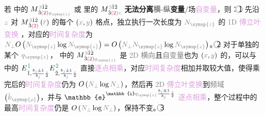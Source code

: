 {\two} 若  中的 ${M}^{\;\! \mathcolor{gray}{3} \hat{1} \hat{2} }_{\;\! \hat{3} \textcolor{Maroon}{(2)} \mathcolor{gray}{q_{\symup{z}}} }$ 或  里的 ${M}^{\;\! \mathcolor{gray}{3} \hat{1} \hat{2} }_{\;\! \hat{3} \textcolor{Maroon}{(2)} \mathcolor{gray}{z} }$ \textbf{无法分离\textcolor{gray}{横-纵}变量}/\textcolor{NavyBlue}{场}\textcolor{Plum}{自变量}，则：\textcircled{1} 先沿 $\textcolor{gray}{z}$ 对 ${M}^{\;\! \mathcolor{gray}{3} \hat{1} \hat{2} }_{\;\! \hat{3} \textcolor{Maroon}{(2)} } \left( \mathcolor{gray}{\bar{r}} \right)$ 的每个 $\left( \textcolor{gray}{x}, \textcolor{gray}{y} \right)$ 格点，独立执行一次长度为 $\textcolor{gray}{N_{\symup{z}}}$ 的 \textcolor{gray}{1D} \textcolor{Plum}{傅立叶变换} ，对应的\textcolor{Plum}{时间复杂度}为 $\textcolor{gray}{N_\perp} O \left( \textcolor{gray}{N_{\symup{z}}} \log \textcolor{gray}{N_{\symup{z}}} \right) = O \left( \textcolor{gray}{N_\perp} \textcolor{gray}{N_{\symup{z}}} \log \textcolor{gray}{N_{\symup{z}}} \right)$。\textcircled{2} 对于单独的某个 $\mathcolor{gray}{q_{\symup{z}}}$， 中的 ${M}^{\;\! \mathcolor{gray}{3} \hat{1} \hat{2} }_{\;\! \hat{3} \textcolor{Maroon}{(2)} \mathcolor{gray}{q_{\symup{z}}} }$ 是 \textcolor{gray}{2D 横向}且\textcolor{gray}{自变量}也为 $\left( \textcolor{gray}{x}, \textcolor{gray}{y} \right)$ 的，可以与 {\one} 中的 ${E}^{\;\! \textcolor{PineGreen}{\hat{1}}}_{\;\! \hat{1}, \frac{b_{\textcolor{NavyBlue}{j}} \pm 1}{b_{\textcolor{NavyBlue}{j}}} \frac{ \mathcolor{gray}{z} }{ 2 }} {E}^{\;\! \textcolor{PineGreen}{\hat{2}}}_{\;\! \hat{2}, \frac{b_{\textcolor{NavyBlue}{j}} \pm 1}{b_{\textcolor{NavyBlue}{j}}} \frac{ \mathcolor{gray}{z} }{ 2 }}$ 直接\textcolor{Plum}{逐点相乘}，对应\textcolor{Plum}{时间复杂度}相加并取较大值，使得乘完后的\textcolor{Plum}{时间复杂度}仍为 $O \left( \textcolor{gray}{N_\perp} \log \textcolor{gray}{N_\perp} \right)$，然后再 \textcolor{gray}{2D} \textcolor{Plum}{傅立叶变换}到\textcolor{gray}{频域} $\left( \mathcolor{gray}{\bar{k}_{\symup{\rho}}} \right)$，并与 $\mathbb{e}^{\mathbb{i} \mathcolor{gray}{q_{\symup{z}}} \frac{b_{\textcolor{NavyBlue}{j}} \pm 1}{b_{\textcolor{NavyBlue}{j}}} \frac{ \mathcolor{gray}{z} }{ 2 }}$ \textcolor{Plum}{逐点相乘}，整个过程中的最高\textcolor{Plum}{时间复杂度}仍是 $O \left( \textcolor{gray}{N_\perp} \log \textcolor{gray}{N_\perp} \right)$，保持不变。\textcircled{3} 